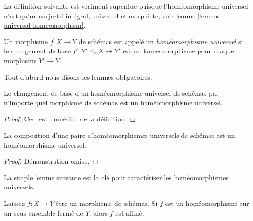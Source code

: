 \noindent
La définition suivante est vraiment superflue puisque l'homéomorphisme universel n'est qu'un surjectif intégral, universel et morphiste, voir lemme \ref{lemma-universal-homeomorphism}.

\begin{definition}

\label{definition-universal-homeomorphism}
Un morphisme $f : X \to Y$ de schémas est appelé un {\it homéomorphisme universel} si le changement de base $f' : Y' \times_Y X \to Y'$ est un homéomorphisme pour chaque morphisme $Y' \to Y$.
\end{definition}

\noindent
Tout d'abord nous disons les lemmes obligatoires.

\begin{lemma}

\label{lemma-base-change-universal-homeomorphism}

Le changement de base d'un homéomorphisme universel de schémas par n'importe quel morphisme de schémas est un homéomorphisme universel.

\end{lemma}

\begin{proof}
Ceci est immédiat de la définition.
\end{proof}

\begin{lemma}

\label{lemma-composition-universal-homeomorphism}

La composition d'une paire d'homéomorphismes universels de schémas est un homéomorphisme universel.

\end{lemma}

\begin{proof}
Démonstration omise.
\end{proof}

\noindent
La simple lemme suivante est la clé pour caractériser les homéomorphismes universels.

\begin{lemma}

\label{lemma-homeomorphism-affine}
Laissez $f : X \to Y$ être un morphisme de schémas. Si $f$ est un homéomorphisme sur un sous-ensemble fermé de $Y$, alors $f$ est affiné.
\end{lemma}

